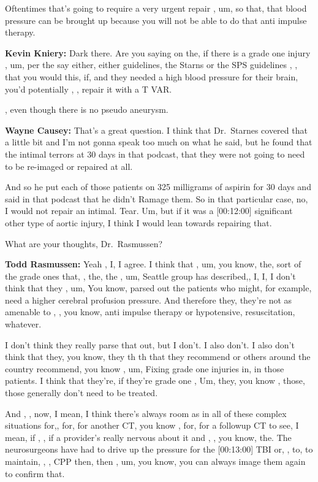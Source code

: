 \documentclass[
]{book}
\begin{document}
Oftentimes that's going to require a very urgent repair , um, so that,
that blood pressure can be brought up because you will not be able to do
that anti impulse therapy.

\textbf{Kevin Kniery:} Dark there. Are you saying on the, if there is a grade
one injury , um, per the say either, either guidelines, the Starns or
the SPS guidelines , , that you would this, if, and they needed a high
blood pressure for their brain, you'd potentially , , repair it with a T
VAR.

, even though there is no pseudo aneurysm.

\textbf{Wayne Causey:} That's a great question. I think that Dr.~Starnes
covered that a little bit and I'm not gonna speak too much on what he
said, but he found that the intimal terrors at 30 days in that podcast,
that they were not going to need to be re-imaged or repaired at all.

And so he put each of those patients on 325 milligrams of aspirin for 30
days and said in that podcast that he didn't Ramage them. So in that
particular case, no, I would not repair an intimal. Tear. Um, but if it
was a {[}00:12:00{]} significant other type of aortic injury, I think I
would lean towards repairing that.

What are your thoughts, Dr.~Rasmussen?

\textbf{Todd Rasmussen:} Yeah , I, I agree. I think that , um, you know, the,
sort of the grade ones that, , the, the , um, Seattle group has
described,, I, I, I don't think that they , um, You know, parsed out the
patients who might, for example, need a higher cerebral profusion
pressure. And therefore they, they're not as amenable to , , you know,
anti impulse therapy or hypotensive, resuscitation, whatever.

I don't think they really parse that out, but I don't. I also don't. I
also don't think that they, you know, they th th that they recommend or
others around the country recommend, you know , um, Fixing grade one
injuries in, in those patients. I think that they're, if they're grade
one , Um, they, you know , those, those generally don't need to be
treated.

And , , now, I mean, I think there's always room as in all of these
complex situations for,, for, for another CT, you know , for, for a
followup CT to see, I mean, if , , if a provider's really nervous about
it and , , you know, the. The neurosurgeons have had to drive up the
pressure for the {[}00:13:00{]} TBI or, , to, to maintain, , , CPP then,
then , um, you know, you can always image them again to confirm that.
\end{document}
